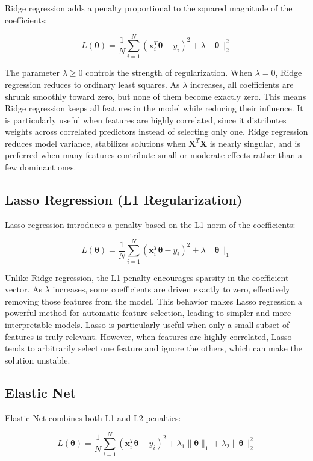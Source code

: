 \documentclass{article}
\begin{document}
Ridge regression adds a penalty proportional to the squared magnitude of the coefficients:

\[
L(\boldsymbol{\theta}) = \frac{1}{N} \sum_{i=1}^{N} (\mathbf{x}_i^T \boldsymbol{\theta} - y_i)^2 + \lambda \|\boldsymbol{\theta}\|_2^2
\]

The parameter $\lambda \ge 0$ controls the strength of regularization. When $\lambda = 0$, Ridge regression reduces to ordinary least squares. As $\lambda$ increases, all coefficients are shrunk smoothly toward zero, but none of them become exactly zero. This means Ridge regression keeps all features in the model while reducing their influence. It is particularly useful when features are highly correlated, since it distributes weights across correlated predictors instead of selecting only one. Ridge regression reduces model variance, stabilizes solutions when $\mathbf{X}^T\mathbf{X}$ is nearly singular, and is preferred when many features contribute small or moderate effects rather than a few dominant ones.

\subsection{Lasso Regression (L1 Regularization)}

Lasso regression introduces a penalty based on the L1 norm of the coefficients:

\[
L(\boldsymbol{\theta}) = \frac{1}{N} \sum_{i=1}^{N} (\mathbf{x}_i^T \boldsymbol{\theta} - y_i)^2 + \lambda \|\boldsymbol{\theta}\|_1
\]

Unlike Ridge regression, the L1 penalty encourages sparsity in the coefficient vector. As $\lambda$ increases, some coefficients are driven exactly to zero, effectively removing those features from the model. This behavior makes Lasso regression a powerful method for automatic feature selection, leading to simpler and more interpretable models. Lasso is particularly useful when only a small subset of features is truly relevant. However, when features are highly correlated, Lasso tends to arbitrarily select one feature and ignore the others, which can make the solution unstable.

\subsection{Elastic Net}

Elastic Net combines both L1 and L2 penalties:

\[
L(\boldsymbol{\theta}) = \frac{1}{N} \sum_{i=1}^{N} (\mathbf{x}_i^T \boldsymbol{\theta} - y_i)^2 + \lambda_1 \|\boldsymbol{\theta}\|_1 + \lambda_2 \|\boldsymbol{\theta}\|_2^2
\]
\end{document}
